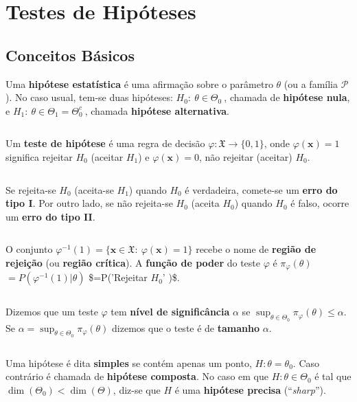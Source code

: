 \documentclass[
]{book}
\begin{document}
\(~\)

\hypertarget{Test}{%
\chapter{Testes de Hipóteses}\label{Test}}

\hypertarget{BasTest}{%
\section{Conceitos Básicos}\label{BasTest}}

Uma \textbf{hipótese estatística} é uma afirmação sobre o parâmetro \(\theta\) (ou a família \(\mathcal{P}\)). No caso usual, tem-se duas hipóteses: \(H_0: ~\theta\in\Theta_0~\), chamada de \textbf{hipótese nula}, e \(H_1: ~\theta\in\Theta_1={\Theta}_0^c~\), chamada \textbf{hipótese alternativa}.

\(~\)

Um \textbf{teste de hipótese} é uma regra de decisão \(\varphi: \mathfrak{X} \longrightarrow \{0,1\}\), onde \(\varphi(\boldsymbol{x})=1\) significa rejeitar \(H_0\) (aceitar \(H_1\)) e \(\varphi(\boldsymbol x)=0\), não rejeitar (aceitar) \(H_0\).

\(~\)

Se rejeita-se \(H_0\) (aceita-se \(H_1\)) quando \(H_0\) é verdadeira, comete-se um \textbf{erro do tipo I}. Por outro lado, se não rejeita-se \(H_0\) (aceita \(H_0\)) quando \(H_0\) é falso, ocorre um \textbf{erro do tipo II}.

\(~\)

O conjunto \(\varphi^{-1}(1)=\{\boldsymbol{x} \in \mathfrak{X} :~ \varphi(\boldsymbol{x})=1\}\) recebe o nome de \textbf{região de rejeição} (ou \textbf{região crítica}). A \textbf{função de poder} do teste \(\varphi\) é
\({\pi}_\varphi(\theta)\) \(=P\left(\varphi^{-1}(1)|\theta\right)\)
\$=P\big(\textrm{'Rejeitar $H_0$'} \textbar{} \theta\big)\$.

\(~\)

Dizemos que um teste \(\varphi\) tem \textbf{nível de significância} \(\alpha\) se \(\displaystyle\sup_{\theta\in\Theta_0}\pi_\varphi(\theta)\leq \alpha\). Se \(\alpha=\displaystyle\sup_{\theta\in\Theta_0}\pi_\varphi(\theta)\) dizemos que o teste é de \textbf{tamanho} \(\alpha\).

\(~\)

Uma hipótese é dita \textbf{simples} se contém apenas um ponto, \(H:\theta=\theta_0\). Caso contrário é chamada de \textbf{hipótese composta}. No caso em que \(H:\theta\in\Theta_0\) é tal que \(\dim(\Theta_0)<\dim(\Theta)\), diz-se que \(H\) é uma \textbf{hipótese precisa} (``\emph{sharp}'').
\end{document}
